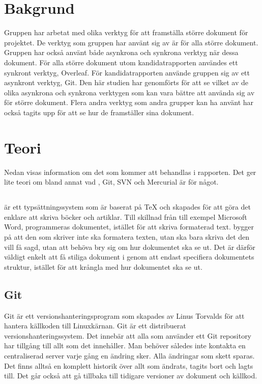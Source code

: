 \section{Bakgrund}
\label{sec:background-tuhkala}
Gruppen har arbetat med olika verktyg för att framställa större dokument för projektet. De verktyg som gruppen har använt sig av är \latex för alla större dokument. Gruppen har också använt både asynkrona och synkrona verktyg när dessa dokument. För alla större dokument utom kandidatrapporten användes ett synkront verktyg, Overleaf. För kandidatrapporten använde gruppen sig av ett asynkront verktyg, Git. Den här studien har genomförts för att se vilket av de olika asynkrona och synkrona verktygen som kan vara bättre att använda sig av för större dokument. Flera andra verktyg som andra grupper kan ha använt har också tagits upp för att se hur de framställer sina dokument.

\section{Teori}
\label{sec:theory-tuhkala}
Nedan visas information om det som kommer att behandlas i rapporten. Det ger lite teori om bland annat vad \latex, Git, SVN och Mercurial är för något.

\subsection{\latex}
\latex \cite{latex_project}\cite{kottwitz2011latex} är ett typsättningssystem som är baserat på TeX och skapades för att göra det enklare att skriva böcker och artiklar. Till skillnad från till exempel Microsoft Word, programmeras dokumentet, istället för att skriva formaterad text. \latex bygger på att den som skriver inte ska formatera texten, utan ska bara skriva det den vill få sagd, utan att behöva bry sig om hur dokumentet ska se ut. Det är därför väldigt enkelt att få stiliga dokument i \latex genom att endast specifiera dokumentets struktur, istället för att krångla med hur dokumentet ska se ut.

\subsection{Git}
Git \cite{git_history} är ett versionshanteringsprogram som skapades av Linus Torvalds för att hantera källkoden till Linuxkärnan. Git är ett distribuerat versionshanteringssystem. Det innebär att alla som använder ett Git repository har tillgång till allt som det innehåller. Man behöver således inte kontakta en centraliserad server varje gång en ändring sker. Alla ändringar som skett sparas. Det finns alltså en komplett historik över allt som ändrats, tagits bort och lagts till. Det går också att gå tillbaka till tidigare versioner av dokument och källkod.


